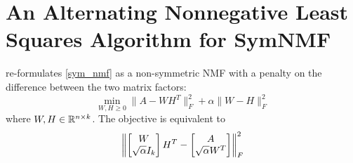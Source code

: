 \section{An Alternating Nonnegative Least Squares Algorithm for SymNMF}

\cite{Kuang:15} re-formulates \ref{sym_nmf} as a non-symmetric NMF
with a penalty on the difference between the two matrix factors:
\[ \min_{W,H \geq 0}
   \|A - W H^T\|_F^2 + \alpha \|W - H\|_F^2
\]
where $W,H \in \mathbb{R}^{n \times k}$. The objective is equivalent to
\[ \left\lVert \begin{bmatrix} W \\ \sqrt{\alpha} I_k \end{bmatrix} H^T
        - \begin{bmatrix} A \\ \sqrt{\alpha} W^T \end{bmatrix} \right\rVert_F^2
\]